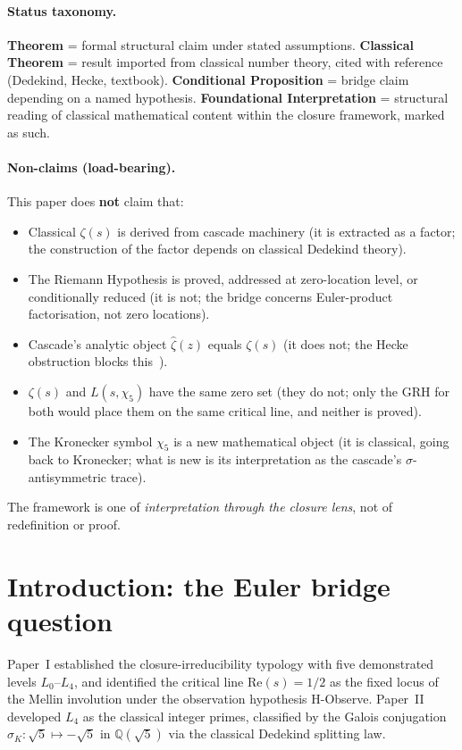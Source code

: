 \documentclass[11pt,a4paper]{article}
\theoremstyle{definition}
\theoremstyle{remark}
\begin{document}
\paragraph{Status taxonomy.}
\textbf{Theorem} = formal structural claim under stated assumptions.
\textbf{Classical Theorem} = result imported from classical number theory,
cited with reference (Dedekind, Hecke, textbook). \textbf{Conditional
Proposition} = bridge claim depending on a named hypothesis.
\textbf{Foundational Interpretation} = structural reading of classical
mathematical content within the closure framework, marked as such.

\paragraph{Non-claims (load-bearing).}
This paper does \textbf{not} claim that:
\begin{itemize}\itemsep0pt
  \item Classical $\zeta(s)$ is derived from cascade machinery (it is extracted as a factor; the construction of the factor depends on classical Dedekind theory).
  \item The Riemann Hypothesis is proved, addressed at zero-location level, or conditionally reduced (it is not; the bridge concerns Euler-product factorisation, not zero locations).
  \item Cascade's analytic object $\hat{\zeta}(z)$ equals $\zeta(s)$ (it does not; the Hecke obstruction blocks this~\cite{rhFormalSmart}).
  \item $\zeta(s)$ and $L(s, \chi_5)$ have the same zero set (they do not; only the GRH for both would place them on the same critical line, and neither is proved).
  \item The Kronecker symbol $\chi_5$ is a new mathematical object (it is classical, going back to Kronecker; what is new is its interpretation as the cascade's $\sigma$-antisymmetric trace).
\end{itemize}
The framework is one of \emph{interpretation through the closure lens},
not of redefinition or proof.

\section{Introduction: the Euler bridge question}\label{sec:intro}

Paper~I established the closure-irreducibility typology with five
demonstrated levels $L_0$--$L_4$, and identified the critical line
$\mathrm{Re}(s) = 1/2$ as the fixed locus of the Mellin involution under
the observation hypothesis H-Observe. Paper~II developed $L_4$ as the
classical integer primes, classified by the Galois conjugation
$\sigma_K : \sqrt{5} \mapsto -\sqrt{5}$ in $\mathbb{Q}(\sqrt{5})$ via the
classical Dedekind splitting law.
\end{document}
